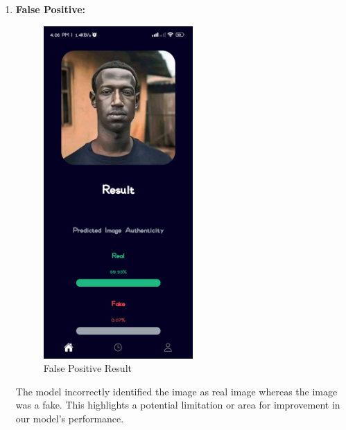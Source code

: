 \begin{enumerate}
          \newpage
    \item \textbf{False Positive:}
          \\
          \begin{figure}[ht]
              \centering
              \includegraphics[height =5in  ]{img/blckzukeOutput.jpg}
              \caption{{False Positive Result}}
          \end{figure}

          The model incorrectly identified the image as real image whereas the image was a fake. This highlights a potential limitation or area for improvement in our model's performance.

          \newpage


\end{enumerate}
